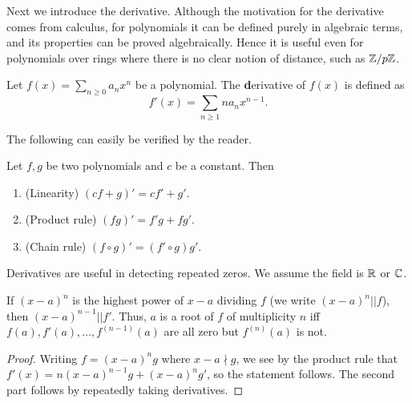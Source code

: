 Next we introduce the derivative. Although the motivation for the derivative comes from calculus, for polynomials it can be defined purely in algebraic terms, and its properties can be proved algebraically. Hence it is useful even for polynomials over rings where there is no clear notion of distance, such as $\mathbb{Z}/p\mathbb{Z}$.
\begin{df}
Let $f(x)=\sum_{n\geq 0} a_nx^n$ be a polynomial. The {\textbf derivative} of $f(x)$ is defined as
\[f'(x)=\sum_{n\geq 1} na_n x^{n-1}.\]
\end{df}
The following can easily be verified by the reader.
\begin{pr}
Let $f,g$ be two polynomials and $c$ be a constant. Then
\begin{enumerate}
\item (Linearity) 
$(cf+g)'=cf'+g'$.
\item (Product rule)
$(fg)'=f'g+fg'$.
\item (Chain rule)
$(f\circ g)'=(f'\circ g)g'$.
\end{enumerate}
\end{pr}

Derivatives are useful in detecting repeated zeros. We assume the field is $\mathbb{R}$ or $\mathbb{C}$.
\begin{pr}
If $(x-a)^n$ is the highest power of $x-a$ dividing $f$ (we write $(x-a)^n||f$), then $(x-a)^{n-1}||f'$. Thus, $a$ is a root of $f$ of multiplicity $n$ iff $f(a), f'(a),\ldots, f^{(n-1)}(a)$ are all zero but $f^{(n)}(a)$ is not.
\end{pr}
\begin{proof}
Writing $f=(x-a)^ng$ where $x-a\nmid g$, we see by the product rule that
$
f'(x)=n(x-a)^{n-1}g+(x-a)^n g'$, so the statement follows. The second part follows by repeatedly taking derivatives.
\end{proof}

